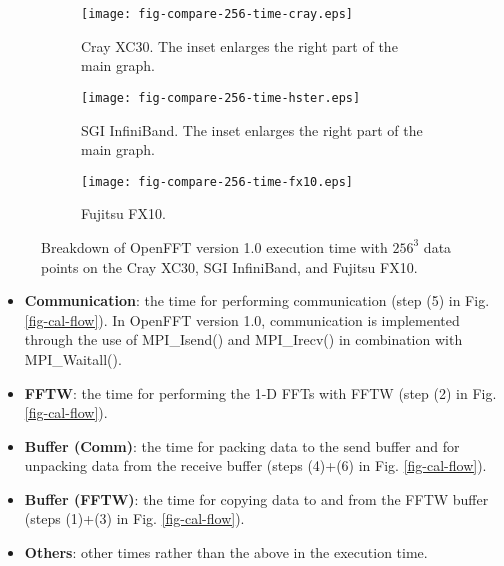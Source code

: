 \begin{figure}[htbp]
        \begin{subfigure}{\textwidth}
                \centering
                \texttt{[image: fig-compare-256-time-cray.eps]}
                \caption{Cray XC30. The inset enlarges the right part of the main graph.}
                \label{fig-breakdown-cray}
        \end{subfigure}

        \begin{subfigure}{\textwidth}
                \centering
                \texttt{[image: fig-compare-256-time-hster.eps]}
                \caption{SGI InfiniBand. The inset enlarges the right part of the main graph.}
                \label{fig-breakdown-hster}
        \end{subfigure}

        \begin{subfigure}{\textwidth}
                \centering
                \texttt{[image: fig-compare-256-time-fx10.eps]}
                \caption{Fujitsu FX10.}
                \label{fig-breakdown-fx10}
        \end{subfigure}\caption{Breakdown of OpenFFT version 1.0 execution time with $256^3$ data points on the Cray XC30, SGI InfiniBand, and Fujitsu FX10.}\label{fig-breakdown-time}
\end{figure}

\begin{itemize}
\item
\textbf{Communication}: the time for performing communication (step (5) in Fig. \ref{fig-cal-flow}). In OpenFFT version 1.0, communication is implemented through the use of MPI\_Isend() and MPI\_Irecv() in combination with MPI\_Waitall(). 
\item
\textbf{FFTW}: the time for performing the 1-D FFTs with FFTW (step (2) in Fig. \ref{fig-cal-flow}). 
\item
\textbf{Buffer (Comm)}: the time for packing data to the send buffer and for unpacking data from the receive buffer (steps (4)+(6) in Fig. \ref{fig-cal-flow}).  
\item
\textbf{Buffer (FFTW)}: the time for copying data to and from the FFTW buffer (steps (1)+(3) in Fig. \ref{fig-cal-flow}).  
\item
\textbf{Others}: other times rather than the above in the execution time.
\end{itemize}

